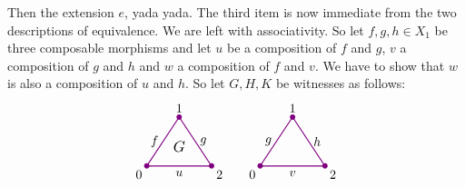         Then the extension $e$, yada yada. The third item is now immediate from the two descriptions of equivalence. We are left with associativity.
        So let $f, g, h \in X_1$ be three composable morphisms and let $u$ be a composition of $f$ and $g$, $v$ a composition of $g$ and $h$ and $w$ a composition of $f$ and $v$. We have to show that $w$ is also a composition of $u$ and $h$. So let $G, H, K$ be witnesses as follows:
        \begin{equation*}
            \begin{tikzpicture}[
                scale=0.9,
                thick,
                color=violet, %
                every node/.style={text=black},
                dot/.style={circle, fill=violet, inner sep=1.5pt, outer sep=0pt}
            ]

                \begin{scope}[shift={(0,0)}]
                    \coordinate (A1) at (0,0);
                    \coordinate (B1) at (1,1.5);
                    \coordinate (C1) at (2,0);

                    \draw (A1) -- node[left] {$f$} (B1)
                        -- node[right] {$g$} (C1)
                        -- node[below] {$u$} (A1);

                    \node[dot] at (A1) {}; \node[below left] at (A1) {0};
                    \node[dot] at (B1) {}; \node[above]      at (B1) {1};
                    \node[dot] at (C1) {}; \node[below right] at (C1) {2};

                    \node[scale=1.2] at (1, 0.6) {$G$};
                \end{scope}

                \begin{scope}[shift={(3.5,0)}]
                    \coordinate (A2) at (0,0);
                    \coordinate (B2) at (1,1.5);
                    \coordinate (C2) at (2,0);

                    \draw (A2) -- node[left] {$g$} (B2)
                        -- node[right] {$h$} (C2)
                        -- node[below] {$v$} (A2); %

                    \node[dot] at (A2) {}; \node[below left] at (A2) {0};
                    \node[dot] at (B2) {}; \node[above]      at (B2) {1};
                    \node[dot] at (C2) {}; \node[below right] at (C2) {2};


\end{scope}
\end{tikzpicture}
\end{equation*}
